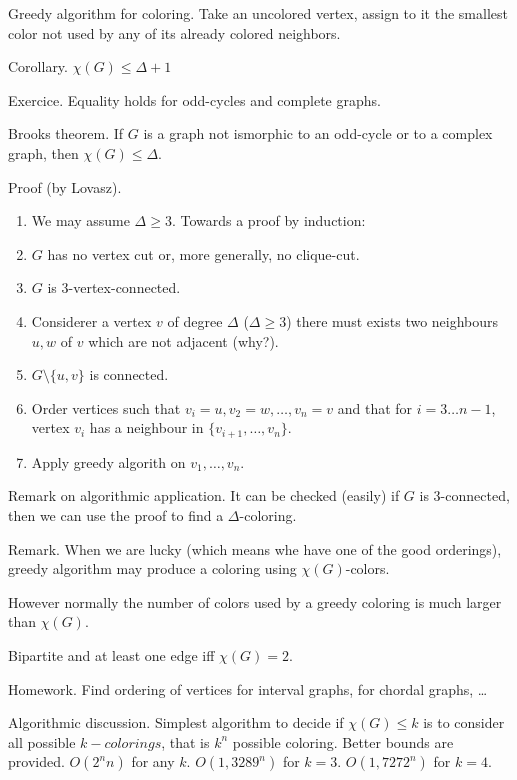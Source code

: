 \documentclass[12pt,a4paper]{article}
\begin{document}
Greedy algorithm for coloring.  Take an uncolored vertex, assign to it the
smallest color not used by any of its already colored neighbors.

Corollary. \(\chi(G) \leq \Delta + 1\)

Exercice. Equality holds for odd-cycles and complete graphs.

Brooks theorem. If \(G\) is a graph not ismorphic to an odd-cycle or to a
complex graph, then \(\chi(G) \leq \Delta\).

Proof (by Lovasz).

\begin{enumerate}
\item We may assume \(\Delta \geq 3\). Towards a proof by induction:
\item \(G\) has no vertex cut or, more generally, no clique-cut.
\item \(G\) is \(3\)-vertex-connected.
\item Considerer a vertex \(v\) of degree \(\Delta\) (\(\Delta \geq 3\)) there
must exists two neighbours \(u, w\) of \(v\) which are not adjacent (why?).
\item \(G \setminus \{u, v\}\) is connected.
\item Order vertices such that \(v_i=u, v_2=w, \dots, v_n=v\) and that for \(i=3
\dots n-1\), vertex \(v_i\) has a neighbour in \(\{v_{i+1}, \dots, v_n\}\).
\item Apply greedy algorith on \(v_1, \dots, v_n\).
\end{enumerate}

Remark on algorithmic application. It can be checked (easily) if \(G\) is
3-connected, then we can use the proof to find a \(\Delta\)-coloring.

Remark. When we are lucky (which means whe have one of the good orderings),
greedy algorithm may produce a coloring using \(\chi(G)\)-colors.

However normally the number of colors used by a greedy coloring is much larger
than \(\chi(G)\).

Bipartite and at least one edge iff \(\chi(G)=2\).

Homework. Find ordering of vertices for interval graphs, for chordal graphs, …

Algorithmic discussion.  Simplest algorithm to decide if \(\chi(G) \leq k\) is
to consider all possible \(k-colorings\), that is \(k^n\) possible
coloring. Better bounds are provided. \(O(2^n n)\) for any
\(k\). \(O(1,3289^n)\) for \(k=3\). \(O(1,7272^n)\) for \(k=4\).
\end{document}
